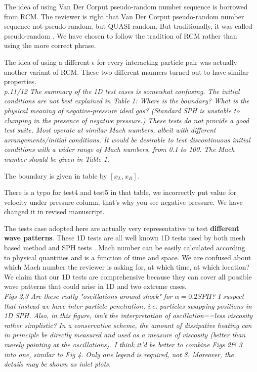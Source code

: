 \documentclass[10pt,a4paper]{article}
\begin{document}
The idea of using Van Der Corput pseudo-random number sequence is borrowed from RCM. The reviewer is right that Van Der Corput pseudo-random number sequence not pseudo-random, but QUASI-random. But traditionally, it was called pseudo-random \citep[][e.g.]{toro2013riemann}. We have chosen to follow the tradition of RCM rather than using the more correct phrase.

The idea of using a different $\epsilon$ for every interacting particle pair was actually another variant of RCM. These two different manners turned out to have similar properties. 
\\[3pt]

\textit{p.11/12 The summary of the 1D test cases is somewhat confusing. The initial conditions are not best explained in Table 1: Where is the boundary? What is the physical meaning of negative-pressure ideal gas? (Standard SPH is unstable to clumping in the presence of negative pressure.)
These tests do not provide a good test suite. Most operate at similar Mach numbers, albeit with different arrangements/initial conditions. It would
be desirable to test discontinuous initial conditions with a wider range of Mach numbers, from 0.1 to 100. The Mach number should be given in Table 1.}

The boundary is given in table by $[x_L, x_R]$.

There is a typo for test4 and test5 in that table, we incorrectly put value for velocity under pressure column, that's why you see negative pressure. We have changed it in revised manuscript.

The tests case adopted here are actually very representative to test \textbf{different wave patterns}. These 1D tests are all well known 1D tests used by both mesh based method \citep[][e.g.]{toro2013riemann, leveque2002finite} and SPH tests \citep[][e.g.]{monaghan1983shock, cha2003implementations, puri2014approximate}. 
Mach number can be easily calculated according to physical quantities and is a function of time and space. We are confused about which Mach number the reviewer is asking for, at which time, at which location?
We claim that our 1D tests are comprehensive because they can cover all possible wave patterns that could arise in 1D and two extreme cases.
\\[3pt]

\textit{Figs 2,3 Are these really "oscillations around shock" for $\alpha = 0.2 SPH$? I suspect that instead we have inter-particle penetration, i.e.
particles swapping positions in 1D SPH. Also, in this figure, isn't the interpretation of oscillation==less viscosity rather simplistic? In a conservative scheme, the amount of dissipative heating can in principle be directly measured and used as a measure of viscosity (better than merely pointing at the oscillations).
I think it'd be better to combine Figs 2\& 3 into one, similar to Fig 4. Only one legend is required, not 8. Moreover, the details may be shown as inlet plots.}
\end{document}

